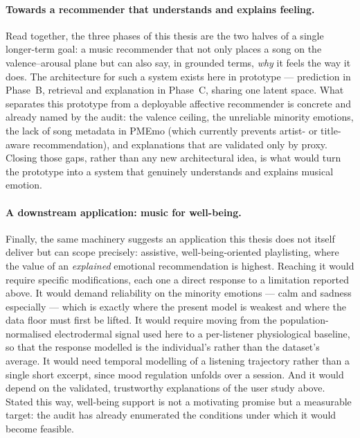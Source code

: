 \documentclass[12pt]{report}
\begin{document}
\paragraph{Towards a recommender that understands and explains feeling.}
Read together, the three phases of this thesis are the two halves of a single longer-term goal: a music recommender that not only places a song on the valence--arousal plane but can also say, in grounded terms, \emph{why} it feels the way it does. The architecture for such a system exists here in prototype --- prediction in Phase~B, retrieval and explanation in Phase~C, sharing one latent space. What separates this prototype from a deployable affective recommender is concrete and already named by the audit: the valence ceiling, the unreliable minority emotions, the lack of song metadata in PMEmo (which currently prevents artist- or title-aware recommendation), and explanations that are validated only by proxy. Closing those gaps, rather than any new architectural idea, is what would turn the prototype into a system that genuinely understands and explains musical emotion.

\paragraph{A downstream application: music for well-being.}
Finally, the same machinery suggests an application this thesis does not itself deliver but can scope precisely: assistive, well-being-oriented playlisting, where the value of an \emph{explained} emotional recommendation is highest. Reaching it would require specific modifications, each one a direct response to a limitation reported above. It would demand reliability on the minority emotions --- calm and sadness especially --- which is exactly where the present model is weakest and where the data floor must first be lifted. It would require moving from the population-normalised electrodermal signal used here to a per-listener physiological baseline, so that the response modelled is the individual's rather than the dataset's average. It would need temporal modelling of a listening trajectory rather than a single short excerpt, since mood regulation unfolds over a session. And it would depend on the validated, trustworthy explanations of the user study above. Stated this way, well-being support is not a motivating promise but a measurable target: the audit has already enumerated the conditions under which it would become feasible.


% 
% 
\end{document}
